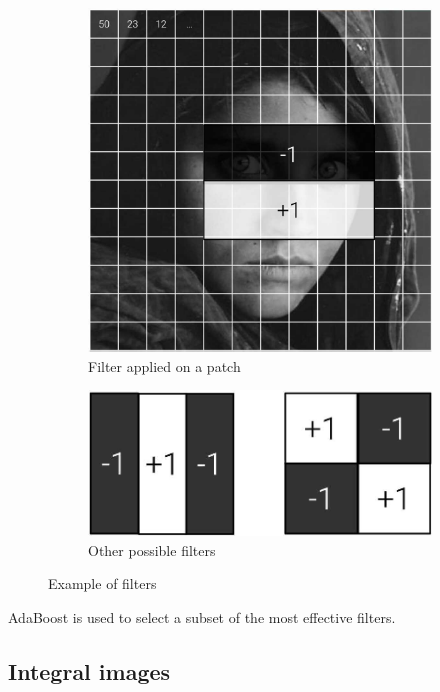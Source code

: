 \begin{description}
        \begin{figure}[H]
            \centering
            \begin{subfigure}{0.6\linewidth}
                \centering
                \includegraphics[width=0.5\linewidth]{./img/_haar_like_example.jpg}
                \caption{Filter applied on a patch}
            \end{subfigure}
            \hfill
            \begin{subfigure}{0.35\linewidth}
                \centering
                \includegraphics[width=0.65\linewidth]{./img/_haar_like_filters_example.jpg}
                \caption{Other possible filters}
            \end{subfigure}
            \caption{Example of filters}
        \end{figure}

        \begin{remark}
            AdaBoost is used to select a subset of the most effective filters.
        \end{remark}
\end{description}


\subsection{Integral images}

